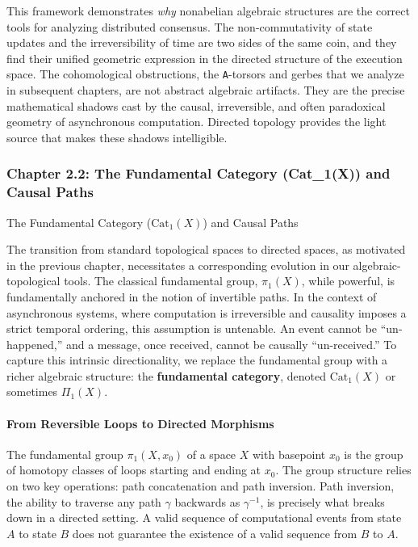 \documentclass[
]{article}
\begin{document}
This framework demonstrates \emph{why} nonabelian algebraic structures
are the correct tools for analyzing distributed consensus. The
non-commutativity of state updates and the irreversibility of time are
two sides of the same coin, and they find their unified geometric
expression in the directed structure of the execution space. The
cohomological obstructions, the \texttt{A}-torsors and gerbes that we
analyze in subsequent chapters, are not abstract algebraic artifacts.
They are the precise mathematical shadows cast by the causal,
irreversible, and often paradoxical geometry of asynchronous
computation. Directed topology provides the light source that makes
these shadows intelligible.

\subsubsection{Chapter 2.2: The Fundamental Category (Cat\_1(X)) and
Causal
Paths}\label{chapter-2.2-the-fundamental-category-cat_1x-and-causal-paths}

\protect{}\label{chapter-2-2-The_Fundamental_Category__Cat_1_X___and}{}

The Fundamental Category (\(\text{Cat}_1(X)\)) and Causal Paths

The transition from standard topological spaces to directed spaces, as
motivated in the previous chapter, necessitates a corresponding
evolution in our algebraic-topological tools. The classical fundamental
group, \(\pi_1(X)\), while powerful, is fundamentally anchored in the
notion of invertible paths. In the context of asynchronous systems,
where computation is irreversible and causality imposes a strict
temporal ordering, this assumption is untenable. An event cannot be
``un-happened,'' and a message, once received, cannot be causally
``un-received.'' To capture this intrinsic directionality, we replace
the fundamental group with a richer algebraic structure: the
\textbf{fundamental category}, denoted \(\text{Cat}_1(X)\) or sometimes
\(\Pi_1(X)\).

\paragraph{From Reversible Loops to Directed
Morphisms}\label{from-reversible-loops-to-directed-morphisms}

The fundamental group \(\pi_1(X, x_0)\) of a space \(X\) with basepoint
\(x_0\) is the group of homotopy classes of loops starting and ending at
\(x_0\). The group structure relies on two key operations: path
concatenation and path inversion. Path inversion, the ability to
traverse any path \(\gamma\) backwards as \(\gamma^{-1}\), is precisely
what breaks down in a directed setting. A valid sequence of
computational events from state \(A\) to state \(B\) does not guarantee
the existence of a valid sequence from \(B\) to \(A\).
\end{document}
